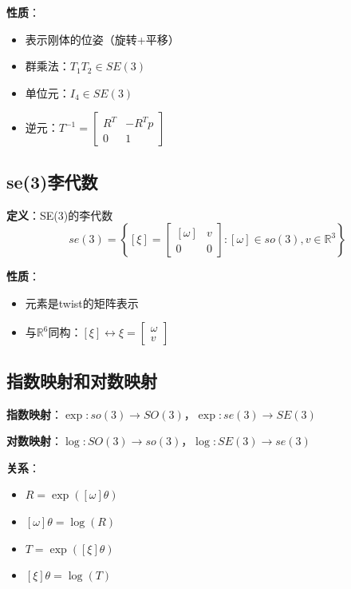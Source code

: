 \documentclass[12pt,a4paper]{article}
\begin{document}
\textbf{性质}：
\begin{itemize}
\item 表示刚体的位姿（旋转+平移）
\item 群乘法：$T_1 T_2 \in SE(3)$
\item 单位元：$I_4 \in SE(3)$
\item 逆元：$T^{-1} = \begin{bmatrix} R^T & -R^T p \\ 0 & 1 \end{bmatrix}$
\end{itemize}

\subsection{se(3)李代数}

\textbf{定义}：SE(3)的李代数
\begin{equation}
se(3) = \left\{[\xi] = \begin{bmatrix} [\omega] & v \\ 0 & 0 \end{bmatrix} : [\omega] \in so(3), v \in \mathbb{R}^3 \right\}
\end{equation}

\textbf{性质}：
\begin{itemize}
\item 元素是twist的矩阵表示
\item 与$\mathbb{R}^6$同构：$[\xi] \leftrightarrow \xi = \begin{bmatrix} \omega \\ v \end{bmatrix}$
\end{itemize}

\subsection{指数映射和对数映射}

\textbf{指数映射}：$\exp: so(3) \to SO(3)$，$\exp: se(3) \to SE(3)$

\textbf{对数映射}：$\log: SO(3) \to so(3)$，$\log: SE(3) \to se(3)$

\textbf{关系}：
\begin{itemize}
\item $R = \exp([\omega]\theta)$
\item $[\omega]\theta = \log(R)$
\item $T = \exp([\xi]\theta)$
\item $[\xi]\theta = \log(T)$
\end{itemize}
\end{document}
